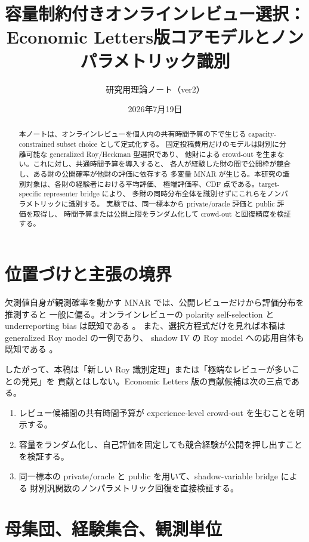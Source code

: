 \documentclass[a4paper,11pt]{ltjsarticle}
\title{容量制約付きオンラインレビュー選択：\\
Economic Letters版コアモデルとノンパラメトリック識別}
\author{研究用理論ノート（ver2）}
\date{2026年7月19日}
\newcommand{\1}{\mathbf 1}
\theoremstyle{definition}
\theoremstyle{plain}
\theoremstyle{remark}
\begin{document}
\maketitle

\begin{abstract}
本ノートは、オンラインレビューを個人内の共有時間予算の下で生じる
capacity-constrained subset choice として定式化する。
固定投稿費用だけのモデルは財別に分離可能な generalized Roy/Heckman 型選択であり、
他財による crowd-out を生まない。これに対し、共通時間予算を導入すると、
各人が経験した財の間で公開枠が競合し、ある財の公開確率が他財の評価に依存する
多変量 MNAR が生じる。本研究の識別対象は、各財の経験者における平均評価、
極端評価率、CDF 点である。target-specific representer bridge により、
多財の同時分布全体を識別せずにこれらをノンパラメトリックに識別する。
実験では、同一標本から private/oracle 評価と public 評価を取得し、
時間予算または公開上限をランダム化して crowd-out と回復精度を検証する。
\end{abstract}

\section{位置づけと主張の境界}

欠測値自身が観測確率を動かす MNAR では、公開レビューだけから評価分布を推測すると
一般に偏る。オンラインレビューの polarity self-selection と underreporting bias は既知である
\parencite{HuPavlouZhang2017,SchoenmuellerNetzerStahl2020,Karaman2021}。
また、選択方程式だけを見れば本稿は generalized Roy model の一例であり、
shadow IV の Roy model への応用自体も既知である \parencite{dHaultfoeuille2010}。

したがって、本稿は「新しい Roy 識別定理」または「極端なレビューが多いことの発見」を
貢献とはしない。Economic Letters 版の貢献候補は次の三点である。
\begin{enumerate}
  \item レビュー候補間の共有時間予算が experience-level crowd-out を生むことを明示する。
  \item 容量をランダム化し、自己評価を固定しても競合経験が公開を押し出すことを検証する。
  \item 同一標本の private/oracle と public を用いて、shadow-variable bridge による
  財別汎関数のノンパラメトリック回復を直接検証する。
\end{enumerate}

\section{母集団、経験集合、観測単位}
\end{document}
